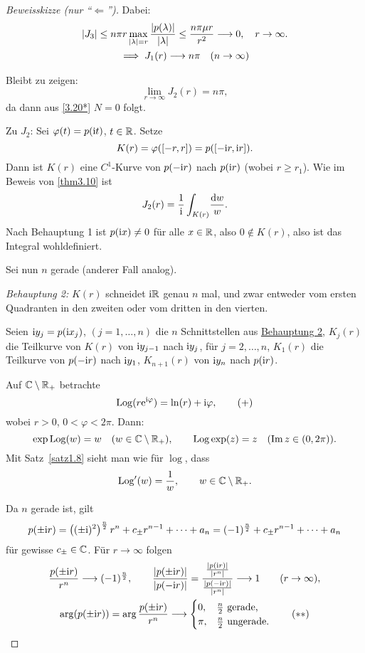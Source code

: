 \documentclass[a4paper,twoside,DIV15,BCOR12mm]{scrbook}
\begin{document}
\begin{proof}[Beweisskizze (nur "`$\Leftarrow$"')]
Dabei:
\begin{gather*}
\left\lvert J_3\right\lvert\leq n\pi r\max_{\left\lvert\lambda\right\lvert=r}\frac{\left\lvert p(\lambda)\right\lvert}{\left\lvert\lambda\right\lvert}\leq\frac{n\pi\mu r}{r^2}\longrightarrow 0,\quad r\to\infty.\\
\implies J_1(r)\longrightarrow n\pi\quad(n\to\infty)
\end{gather*}

Bleibt zu zeigen:
\[\lim_{r\to\infty} J_2(r) = n\pi,\]
da dann aus \eqref{3.20*} $N=0$ folgt.

Zu $J_2$: Sei $\varphi(t) = p(\mathrm{i} t)$, $t\in\mathbb{R}$. Setze
\[K(r) = \varphi([-r,r]) = p([-\mathrm{i} r,\mathrm{i} r]).\]
Dann ist $K(r)$ eine $C^1$-Kurve von $p(-\mathrm{i} r)$ nach $p(\mathrm{i} r)$ (wobei $r\geq r_1$). Wie im Beweis von \ref{thm3.10} ist
\[J_2(r) = \frac{1}{\mathrm{i}}\int_{K(r)}\!\frac{\mathrm{d} w}{w}.\]
Nach Behauptung 1 ist $p(\mathrm{i} x)\neq 0$ für alle $x\in\mathbb{R}$, also $0\notin K(r)$, also ist das Integral wohldefiniert.

Sei nun $n$ gerade (anderer Fall analog).

\textit{Behauptung 2:}\label{3.20beh2} $K(r)$ schneidet $\mathrm{i}\mathbb{R}$ genau $n$ mal, und zwar entweder vom ersten Quadranten in den zweiten oder vom dritten in den vierten.

Seien $\mathrm{i} y_j = p(\mathrm{i} x_j)$, $(j=1,\dotsc,n)$ die $n$ Schnittstellen aus \hyperref[3.20beh2]{Behauptung 2}, $K_j(r)$ die Teilkurve von $K(r)$ von $\mathrm{i} y_{j-1}$ nach $\mathrm{i} y_j$, für $j=2,\dotsc,n$, $K_1(r)$ die Teilkurve von $p(-\mathrm{i} r)$ nach $\mathrm{i} y_1$, $K_{n+1}(r)$ von $\mathrm{i} y_n$ nach $p(\mathrm{i} r)$.

Auf $\mathbb{C}\setminus\mathbb{R}_+$ betrachte
\[\label{3.20+}\mathrm{Log}(r\mathrm{e}^{\mathrm{i}\varphi}) = \ln(r) + \mathrm{i}\varphi,\tag{+}\]
wobei $r>0$, $0<\varphi<2\pi$. Dann:
\[\exp\mathrm{Log}(w) = w\quad(w\in\mathbb{C}\setminus\mathbb{R}_+),\qquad\mathrm{Log}\exp(z) = z\quad(\operatorname{Im}{z}\in(0,2\pi)).\]
Mit Satz~\ref{satz1.8} sieht man wie für $\log$, dass
\[\mathrm{Log}^\prime(w) = \frac{1}{w},\qquad w\in\mathbb{C}\setminus\mathbb{R}_+.\]

Da $n$ gerade ist, gilt
\[p(\pm\mathrm{i} r) = \left((\pm\mathrm{i})^2\right)^{\frac{n}{2}}r^n + c_{\pm}r^{n-1}+\dotsb+a_n = (-1)^{\frac{n}{2}}+c_\pm r^{n-1} + \dotsb + a_n\]
für gewisse $c_\pm\in\mathbb{C}$. Für $r\to\infty$ folgen
\begin{gather*}
\frac{p(\pm\mathrm{i} r)}{r^n}\longrightarrow(-1)^{\frac{n}{2}},\qquad\frac{\left\lvert p(\pm\mathrm{i} r)\right\lvert}{\left\lvert p(-\mathrm{i} r)\right\lvert} = \frac{\frac{\left\lvert p(\mathrm{i} r)\right\lvert}{\left\lvert r^n\right\lvert}}{\frac{\left\lvert p(-\mathrm{i} r)\right\lvert}{\left\lvert r^n\right\lvert}}\longrightarrow 1\qquad(r\to\infty),\\
\label{3.20**}\arg(p(\pm\mathrm{i} r)) = \arg\frac{p(\pm\mathrm{i} r)}{r^n}\longrightarrow\begin{cases}0,&\frac{n}{2}\text{ gerade,}\\\pi,&\frac{n}{2}\text{ ungerade.}\end{cases}\tag{$**$}
\end{gather*}


\end{proof}
\end{document}
